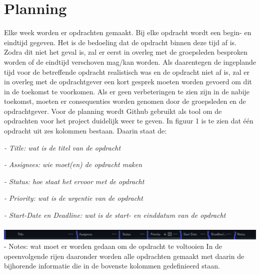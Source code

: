\section{Planning}
Elke week worden er opdrachten gemaakt. Bij elke opdracht wordt een begin- en eindtijd gegeven. Het is de bedoeling dat de opdracht binnen deze tijd af is. Zodra dit niet het geval is, zal er eerst in overleg met de groepsleden besproken worden of de eindtijd verschoven mag/kan worden. Als daarentegen de ingeplande tijd voor de betreffende opdracht realistisch was en de opdracht niet af is, zal er in overleg met de opdrachtgever een kort gesprek moeten worden gevoerd om dit in de toekomst te voorkomen. Als er geen verbeteringen te zien zijn in de nabije toekomst, moeten er consequenties worden genomen door de groepsleden en de opdrachtgever.
Voor de planning wordt Github gebruikt als tool om de opdrachten voor het project duidelijk weer te geven. In figuur 1 is te zien dat één opdracht uit zes kolommen bestaan. Daarin staat de:

\textit{- Title: wat is de titel van de opdracht}

\textit{- Assignees: wie moet(en) de opdracht maken}

\textit{- Status: hoe staat het ervoor met de opdracht}

\textit{- Priority: wat is de urgentie van de opdracht}

\textit{- Start-Date en Deadline: wat is de start- en einddatum van de opdracht}
\\\\
\includegraphics[width=6.7in]{IMG/08_planning_01.png} \\
- Notes: wat moet er worden gedaan om de opdracht te voltooien
In de opeenvolgende rijen daaronder worden alle opdrachten gemaakt met daarin de bijhorende informatie die in de bovenste kolommen gedefinieerd staan.
\\\\